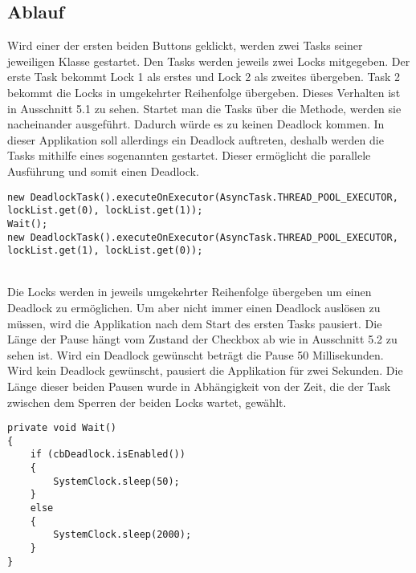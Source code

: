 \subsection{Ablauf}
Wird einer der ersten beiden Buttons geklickt, werden zwei Tasks seiner jeweiligen Klasse gestartet. Den Tasks werden jeweils zwei Locks mitgegeben. Der erste Task bekommt Lock 1 als erstes und Lock 2 als zweites übergeben. Task 2 bekommt die Locks in umgekehrter Reihenfolge übergeben. Dieses Verhalten ist in Ausschnitt 5.1 zu sehen. Startet man die Tasks über die  Methode, werden sie nacheinander ausgeführt. Dadurch würde es zu keinen Deadlock kommen. In dieser Applikation soll allerdings ein Deadlock auftreten, deshalb werden die Tasks mithilfe eines sogenannten  gestartet. Dieser ermöglicht die parallele Ausführung und somit einen Deadlock.
\\
\begin{lstlisting}[float,floatplacement=H,caption=Starten der Tasks]
new DeadlockTask().executeOnExecutor(AsyncTask.THREAD_POOL_EXECUTOR, lockList.get(0), lockList.get(1));
Wait();
new DeadlockTask().executeOnExecutor(AsyncTask.THREAD_POOL_EXECUTOR, lockList.get(1), lockList.get(0));
\end{lstlisting}
\\
Die Locks werden in jeweils umgekehrter Reihenfolge übergeben um einen Deadlock zu ermöglichen. Um aber nicht immer einen Deadlock auslösen zu müssen, wird die Applikation nach dem Start des ersten Tasks pausiert. Die Länge der Pause hängt vom Zustand der Checkbox  ab wie in Ausschnitt 5.2 zu sehen ist. Wird ein Deadlock gewünscht beträgt die Pause 50 Millisekunden. Wird kein Deadlock gewünscht, pausiert die Applikation für zwei Sekunden. Die Länge dieser beiden Pausen wurde in Abhängigkeit von der Zeit, die der Task zwischen dem Sperren der beiden Locks wartet, gewählt.

\begin{lstlisting}[float,floatplacement=H,caption=Pausieren der Applikation]
private void Wait()
{
    if (cbDeadlock.isEnabled())
    {
        SystemClock.sleep(50);
    }
    else
    {
        SystemClock.sleep(2000);
    }
}
\end{lstlisting}


